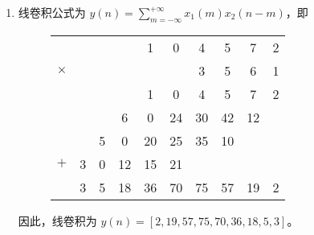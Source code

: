 \begin{solution}
    \begin{enumerate}[label=(\arabic*)]
        \item 线卷积公式为 $y(n) = \sum_{m = -\infty}^{+\infty}x_1(m)x_2(n - m)$，即
            \begin{figure}[H]
                \centering
                \begin{tabular}{c c c c c c c c c c}
                    & & & & 1 & 0 & 4 & 5 & 7 & 2 \\
                    $\times$ & & & & & & 3 & 5 & 6 & 1 \\
                    \hline
                    & & & & 1 & 0 & 4 & 5 & 7 & 2 \\
                    & & & 6 & 0 & 24 & 30 & 42 & 12 \\
                    & & 5 & 0 & 20 & 25 & 35 & 10 \\
                    $+$ & 3 & 0 & 12 & 15 & 21 \\
                    \hline
                    & 3 & 5 & 18 & 36 & 70 & 75 & 57 & 19 & 2
                \end{tabular}
            \end{figure}
            因此，线卷积为 $y(n) = [2, 19, 57, 75, 70, 36, 18, 5, 3]$。
            

\end{enumerate}
\end{solution}
